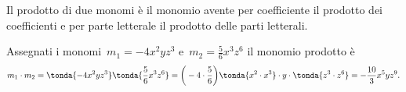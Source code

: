 \begin{definizione}
 Il prodotto di due monomi è il monomio avente
per coefficiente il prodotto dei coefficienti e per parte letterale il
prodotto delle parti letterali.
\end{definizione}

 \begin{esempio}
Assegnati i monomi~\(m_{1}=-4x^{2}yz^{3}\) e~\(m_{2}=\frac{5}{6}x^{3}z^{6}\)
il monomio prodotto è
\[m_{1} \cdot m_{2}=\tonda{-4x^{2}yz^{3}} \tonda{\frac{5}{6}x^{3}z^{6}}=
\bigg(-4\cdot {\frac{5}{6}}\bigg)\tonda{x^{2}\cdot x^{3}}\cdot 
y\cdot \tonda{z^{3}\cdot z^{6}}=-\frac{10}{3}x^{5}yz^{9}.\]
 \end{esempio}


% 

% 


